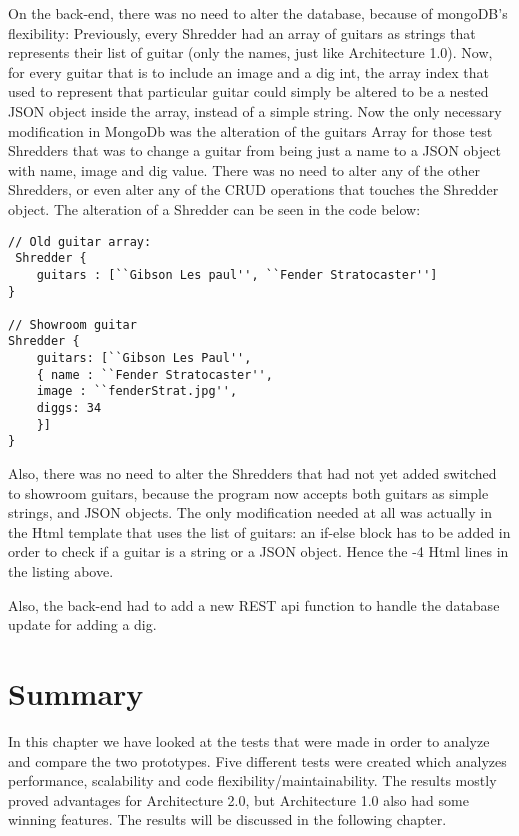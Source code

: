 On the back-end, there was no need to alter the database, because of mongoDB's flexibility: Previously, every Shredder had an array of guitars as strings that represents their list of guitar (only the names, just like Architecture 1.0). Now, for every guitar that is to include an image and a dig int, the array index that used to represent that particular guitar could simply be altered to be a nested JSON object inside the array, instead of a simple string. Now the only necessary modification in MongoDb was the alteration of the guitars Array for those test Shredders that was to change a guitar from being just a name to a JSON object with name, image and dig value. There was no need to alter any of the other Shredders, or even alter any of the CRUD operations that touches the Shredder object. The alteration of a Shredder can be seen in the code below:
\begin{lstlisting}
// Old guitar array:
 Shredder {
	guitars : [``Gibson Les paul'', ``Fender Stratocaster'']
}

// Showroom guitar
Shredder {
	guitars: [``Gibson Les Paul'',
	{ name : ``Fender Stratocaster'',
	image : ``fenderStrat.jpg'',
	diggs: 34
	}]
}
\end{lstlisting}

Also, there was no need to alter the Shredders that had not yet added switched to showroom guitars, because the program now accepts both guitars as simple strings, and JSON objects. The only modification needed at all was actually in the Html template that uses the list of guitars: an if-else block has to be added in order to check if a guitar is a string or a JSON object. Hence the -4 Html lines in the listing above.

Also, the back-end had to add a new REST api function to handle the database update for adding a dig. 

\section{Summary}
In this chapter we have looked at the tests that were made in order to analyze and compare the two prototypes. Five different tests were created which analyzes performance, scalability and code flexibility/maintainability. The results mostly proved advantages for Architecture 2.0, but Architecture 1.0 also had some winning features.  The results will be discussed in the following chapter. %


